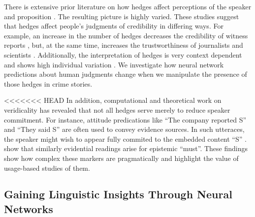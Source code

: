 \documentclass[11pt,a4paper]{article}
\begin{document}
There is extensive prior literature on how hedges affect perceptions of the speaker and proposition \citep{Erickson-etal:1978, durik2008effects, bonnefon2006tactful, rubin:2007:ShortPapers, jensen2008scientific, ferson2015natural}.  The resulting picture is highly varied. 
These studies suggest that hedges affect people's judgments of credibility in differing ways. For example, an increase in the number of hedges decreases the credibility of witness reports \citep{Erickson-etal:1978}, but, at the same time, increases the trustworthiness of journalists and scientists \citep{jensen2008scientific}. Additionally, the interpretation of hedges is very context dependent \citep{bonnefon2006tactful,durik2008effects,ferson2015natural} and shows high individual variation \citep{rubin:2007:ShortPapers,ferson2015natural}. 
We investigate how neural network predictions about human judgments change when we manipulate the presence of those hedges in crime stories.

<<<<<<< HEAD
In addition, computational and theoretical work on veridicality has revealed that not all hedges serve merely to reduce speaker commitment. For instance, attitude predications like ``The company reported S'' and ``They said S'' are often used to convey evidence sources. In such utteraces, the speaker might wish to appear fully commited to the embedded content ``S'' \citep{Simons07,deMarneffe:Manning:Potts:2012,White:Rawlins:2018,White-etal:2018}. \citet{vonFintel:Gillies:2010} show that similarly evidential readings arise for epistemic ``must''. These findings show how complex these markers are pragmatically and highlight the value of usage-based studies of them.


\subsection{Gaining Linguistic Insights Through Neural Networks}
\end{document}
